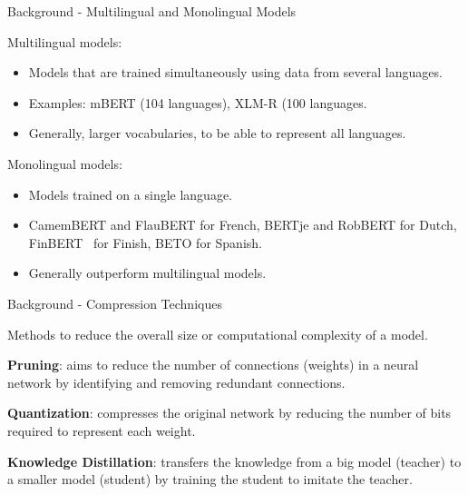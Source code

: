 \documentclass[aspectratio=169,xcolor=dvipsnames]{beamer}
\newenvironment{wideitemize}{\itemize\addtolength{\itemsep}{10pt}}{\enditemize}
\begin{document}
\begin{frame}{Background - Multilingual and Monolingual Models}

\begin{wideitemize}
    \item Multilingual models:
    \begin{itemize}
        \item Models that are trained simultaneously using data from several languages.
        \item Examples: mBERT (104 languages), XLM-R (100 languages.
        \item Generally, larger vocabularies, to be able to represent all languages.
    \end{itemize}
    \item Monolingual models:
    \begin{itemize}
        \item Models trained on a single language.
        \item CamemBERT \citep{martin-etal-2020-camembert} and FlauBERT \citep{le-etal-2020-flaubert-unsupervised} for French, BERTje \citep{devries2019bertje} and RobBERT \citep{delobelle-etal-2020-robbert} for Dutch, FinBERT~\citep{virtanen2019multilingual} for Finish, BETO \citep{CaneteCFP2020} for Spanish.
        \item Generally outperform multilingual models.
    \end{itemize}
\end{wideitemize}

\end{frame}
\begin{frame}{Background - Compression Techniques}

\begin{wideitemize}
    \item Methods to reduce the overall size or computational complexity of a model.
    \item \textbf{Pruning}: aims to reduce the number of connections (weights) in a neural network by identifying and removing redundant connections.
    \item \textbf{Quantization}: compresses the original network by reducing the number of bits required to represent each weight.
    \item \textbf{Knowledge Distillation}: transfers the knowledge from a big model (teacher) to a smaller model (student) by training the student to imitate the teacher.
\end{wideitemize}

\end{frame}
\end{document}
